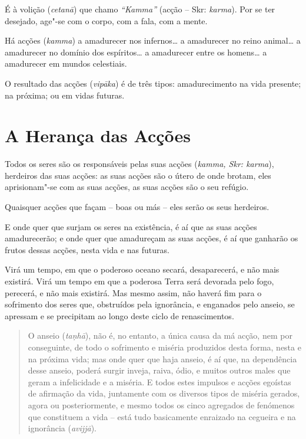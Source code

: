 É à volição (\emph{cetanā}) que chamo \emph{“Kamma”} (acção -- Skr: \emph{karma}). Por se ter
desejado, age"-se com o corpo, com a fala, com a mente.

Há acções (\emph{kamma}) a amadurecer nos infernos\ldots{} a amadurecer no reino
animal\ldots{} a amadurecer no domínio dos espíritos\ldots{} a amadurecer entre
os homens\ldots{} a amadurecer em mundos celestiais.

O resultado das acções (\emph{vipāka}) é de três tipos: amadurecimento na vida
presente; na próxima; ou em vidas futuras.


\section{A Herança das Acções}

Todos os seres são os responsáveis pelas suas acções (\emph{kamma, Skr: karma}),
herdeiros das suas acções: as suas acções são o útero de onde brotam, eles
aprisionam"-se com as suas acções, as suas acções são o seu refúgio.

Quaisquer acções que façam -- boas ou más -- eles serão os seus herdeiros.


E onde quer que surjam os seres na existência, é aí que as suas acções
amadurecerão; e onde quer que amadureçam as suas acções, é aí que ganharão os
frutos dessas acções, nesta vida e nas futuras.


Virá um tempo, em que o poderoso oceano secará, desaparecerá, e não mais
existirá. Virá um tempo em que a poderosa Terra será devorada pelo fogo,
perecerá, e não mais existirá. Mas mesmo assim, não haverá fim para o sofrimento
dos seres que, obstruídos pela ignorância, e enganados pelo anseio, se apressam
e se precipitam ao longo deste ciclo de renascimentos.


\clearpage

\begin{quote}
  O anseio (\emph{ta\d{n}hā}), não é, no entanto, a única causa da má acção, nem por
  conseguinte, de todo o sofrimento e miséria produzidos desta forma, nesta e na
  próxima vida; mas onde quer que haja anseio, é aí que, na dependência desse
  anseio, poderá surgir inveja, raiva, ódio, e muitos outros males que geram a
  infelicidade e a miséria. E todos estes impulsos e acções egoístas de
  afirmação da vida, juntamente com os diversos tipos de miséria gerados, agora
  ou posteriormente, e mesmo todos os cinco agregados de fenómenos que
  constituem a vida -- está tudo basicamente enraizado na cegueira e na
  ignorância (\emph{avijjā}).
\end{quote}

